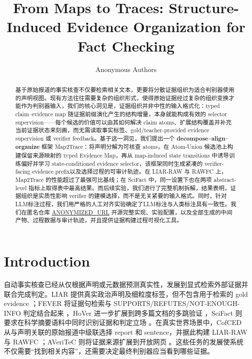 \documentclass[letterpaper]{article}
\title{From Maps to Traces: Structure-Induced Evidence Organization for Fact Checking}
\author{Anonymous Authors}
\begin{document}
\maketitle

\begin{abstract}
基于原始报道的事实核查不仅要检索相关文本，更要将分散证据组织为适合判别器使用的声明视图。现有方法往往需要复杂的组织形式，使得原始证据经过复杂的组织变换才能作为判别器输入，我们的核心洞见是，证据组织并非中性的输入格式化：typed claim--evidence map 随证据前缀演化产生的结构增量，本身就能构成有效的 selector supervision——每个候选的价值可以由其如何解决 claim atoms、扩展结构覆盖并补充当前证据状态来刻画，而无需读取事实标签、gold/teacher-provided evidence supervision 或 verifier feedback。基于这一洞见，我们提出一个 \textbf{decompose--align--organize} 框架 Map2Trace：将声明分解为可核查 atoms，在 Atom-Union 候选池上构建保留来源映射的 typed Evidence Map，再从 map-induced state transitions 中诱导训练偏好并学习 state-conditioned evidence selector，该框架同时生成紧凑的 verifier-facing evidence prefix以及选择过程的可审计轨迹。在 LIAR-RAW 与 RAWFC 上，Map2Trace 的性能超过了最强可比基线；在 SciFact 中，同一设置下也在两项 abstract-level 指标上取得表中最高结果。而后续实验，我们进行了完整机制拆解，结果表明，证据组织是实质性影响 verifier 的建模选择，而不是无关紧要的输入格式。同时，针对LLM标注过程，我们用严格的人工对齐实验确定了LLM标注与人类标注具有一致性。我们在匿名仓库 \url{ANONYMIZED_URL} 开源完整实现、实验配置，以及全部生成的中间产物、过程数据与审计轨迹，并且提供证据构建过程可视化工具。

\end{abstract}

\section{Introduction}

自动事实核查已经从仅根据声明或元数据预测真实性，发展到显式检索外部证据并联合完成判定。LIAR 提供真实政治声明及细粒度标签，但不包含用于检索的 gold evidence \citep{Wang2017LIAR}；FEVER 将证据句检索与 SUPPORTS/REFUTES/NOT-ENOUGH-INFO 判定结合起来 \citep{Thorne2018FEVER}，HoVer 进一步扩展到跨多篇文档的多跳验证 \citep{Jiang2020HoVer}，SciFact 则要求在科学摘要语料中同时识别证据和判定立场 \citep{Wadden2020SciFact}。在真实世界场景中，CofCED 从与声明关联的原始报道中级联选择 report 和 sentence，并据此构建 LIAR-RAW 与 RAWFC \citep{Yang2022CofCED}；AVeriTeC 则将证据来源扩展到开放网页 \citep{Schlichtkrull2023AVeriTeC}。这些任务的发展使系统不仅需要“找到相关内容”，还需要决定最终判别器应当看到哪些证据。
\end{document}
